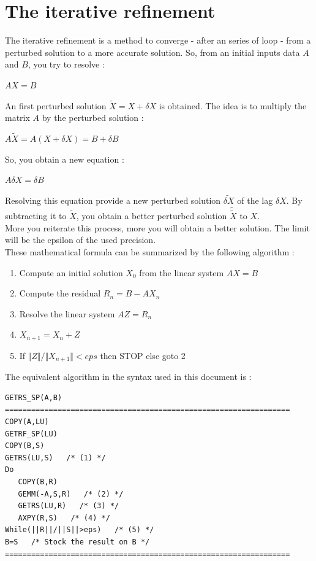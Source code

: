 \documentclass{report}
\begin{document}
\section{The iterative refinement}
The iterative refinement is a method to converge - after an series of loop - from a perturbed solution to a more accurate solution. So, from an initial inputs data $A$ and $B$, you try to resolve :
\begin{center}
$AX=B$
\end{center}
An first perturbed solution $\tilde{X}=X+\delta{X}$ is obtained. The idea is to multiply the matrix $A$ by the perturbed solution :
\begin{center}
$A\tilde{X}=A(X+\delta{X})=B+\delta{B}$
\end{center}
So, you obtain a new equation :
\begin{center}
$A\delta{X}=\delta{B}$
\end{center}
Resolving this equation provide a new perturbed solution $\widetilde{\delta{X}}$ of the lag $\delta{X}$. By subtracting it to $\tilde{X}$, you obtain a better perturbed solution $\tilde{\tilde{X}}$ to $X$.\\
More you reiterate this process, more you will obtain a better solution. The limit will be the epsilon of the used precision.\\
These mathematical formula can be summarized by the following algorithm :
\begin{enumerate}
\item Compute an initial solution $X_0$ from the linear system $AX=B$
\item Compute the residual $R_n=B-AX_n$
\item Resolve the linear system $AZ=R_n$
\item $X_{n+1}=X_n+Z$
\item If $\Vert{Z}\Vert/\Vert{X_{n+1}}\Vert<eps$ then STOP else goto 2
\end{enumerate}
The equivalent algorithm in the syntax used in this document is :
\begin{verbatim}
GETRS_SP(A,B)
=================================================================
COPY(A,LU)
GETRF_SP(LU)
COPY(B,S)
GETRS(LU,S)   /* (1) */
Do
   COPY(B,R)   
   GEMM(-A,S,R)   /* (2) */
   GETRS(LU,R)   /* (3) */
   AXPY(R,S)   /* (4) */
While(||R||/||S||>eps)   /* (5) */
B=S   /* Stock the result on B */
=================================================================
\end{verbatim}
\end{document}
